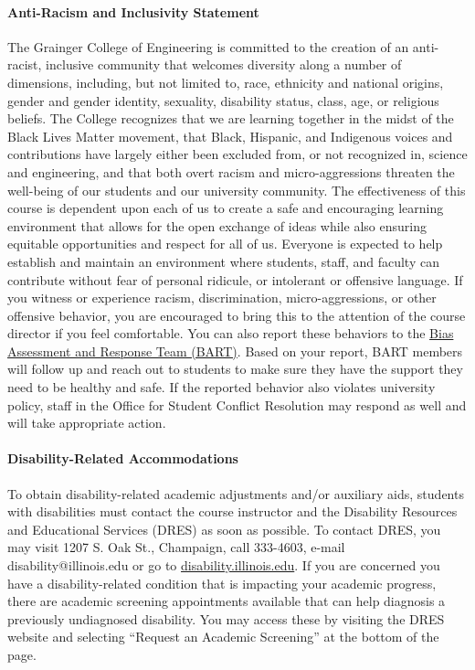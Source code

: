 \documentclass[11pt, a4paper]{article}
\begin{document}
\paragraph{Anti-Racism and Inclusivity Statement} The Grainger College of 
        Engineering is committed to the creation of an anti-racist, inclusive 
        community that welcomes diversity along a number of dimensions, 
        including, but not limited to, race, ethnicity and national origins, 
        gender and gender identity, sexuality, disability status, class, age, 
        or religious beliefs. The College recognizes that we are learning 
        together in the midst of the Black Lives Matter movement, that Black, 
        Hispanic, and Indigenous voices and contributions have largely either 
        been excluded from, or not recognized in, science and engineering, and 
        that both overt racism and micro-aggressions threaten the well-being of 
        our students and our university community.
        The effectiveness of this course is dependent upon each of us to create 
        a safe and encouraging learning environment that allows for the open 
        exchange of ideas while also ensuring equitable opportunities and 
        respect for all of us. Everyone is expected to help establish and 
        maintain an environment where students, staff, and faculty can 
        contribute without fear of personal ridicule, or intolerant or 
        offensive language. If you witness or experience racism, 
        discrimination, micro-aggressions, or other offensive behavior, you are 
        encouraged to bring this to the attention of the course director if you 
        feel comfortable. You can also report these behaviors to the 
        \href{https://bart.illinois.edu/}{Bias Assessment and Response Team 
        (BART)}.  Based on your report, BART members will follow up and reach 
        out to students to make sure they have the support they need to be 
        healthy and safe. If the reported behavior also violates university 
        policy, staff in the Office for Student Conflict Resolution may respond 
        as well and will take appropriate action.  

\paragraph{Disability-Related Accommodations}
To obtain disability-related academic adjustments and/or auxiliary aids, 
students with disabilities must contact the course instructor and the 
Disability Resources and Educational Services (DRES) as soon as possible. To 
contact DRES, you may visit 1207 S. Oak St., Champaign, call 333-4603, e-mail 
disability@illinois.edu or go to 
\href{https://www.disability.illinois.edu}{disability.illinois.edu}.  If you 
are concerned you have a disability-related condition that is impacting your 
academic progress, there are academic screening appointments available that can 
help diagnosis a previously undiagnosed disability. You may access these by 
visiting the DRES website and selecting “Request an Academic Screening” at the 
bottom of the page.
\end{document}
